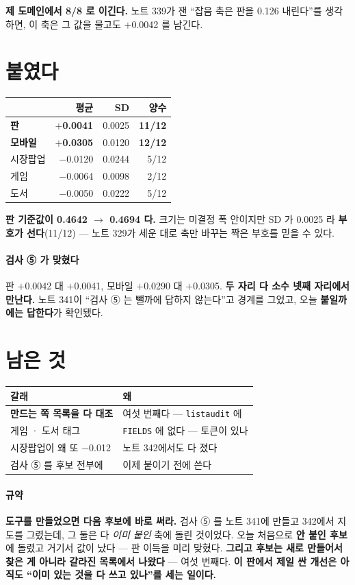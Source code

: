 \documentclass[10pt]{article}
\begin{document}
\textbf{제 도메인에서 8/8 로 이긴다.} 노트 339가 잰 ``잡음 축은 판을
0.126 내린다''를 생각하면, 이 축은 그 값을 물고도 $+$0.0042 를 남긴다.

\section{붙였다}

\begin{center}\footnotesize
\begin{tabular}{lrrr}
\hline
 & 평균 & SD & 양수 \\
\hline
\textbf{판} & \textbf{$+$0.0041} & 0.0025 & \textbf{11/12} \\
\textbf{모바일} & \textbf{$+$0.0305} & 0.0120 & \textbf{12/12} \\
시장팝업 & $-$0.0120 & 0.0244 & 5/12 \\
게임 & $-$0.0064 & 0.0098 & 2/12 \\
도서 & $-$0.0050 & 0.0222 & 5/12 \\
\hline
\end{tabular}
\end{center}

\textbf{판 기준값이 0.4642 $\to$ 0.4694 다.} 크기는 미결정 폭 안이지만
SD 가 0.0025 라 \textbf{부호가 선다}(11/12) --- 노트 329가 세운 대로
축만 바꾸는 짝은 부호를 믿을 수 있다.

\paragraph{검사 ⑤ 가 맞혔다} 판 $+$0.0042 대 $+$0.0041, 모바일
$+$0.0290 대 $+$0.0305. \textbf{두 자리 다 소수 넷째 자리에서 만난다.}
노트 341이 ``검사 ⑤ 는 뺄까에 답하지 않는다''고 경계를 그었고, 오늘
\textbf{붙일까에는 답한다}가 확인됐다.

\section{남은 것}
\begin{center}\footnotesize
\begin{tabular}{ll}
\hline
갈래 & 왜 \\
\hline
\textbf{만드는 쪽 목록을 다 대조} & 여섯 번째다 --- \texttt{listaudit} 에 \\
게임 · 도서 태그 & \texttt{FIELDS} 에 없다 --- 토큰이 있나 \\
시장팝업이 왜 또 $-$0.012 & 노트 342에서도 다 졌다 \\
검사 ⑤ 를 후보 전부에 & 이제 붙이기 전에 쓴다 \\
\hline
\end{tabular}
\end{center}

\paragraph{규약} \textbf{도구를 만들었으면 다음 후보에 바로 써라.} 검사 ⑤
를 노트 341에 만들고 342에서 지도를 그렸는데, 그 둘은 다 \emph{이미 붙인}
축에 돌린 것이었다. 오늘 처음으로 \textbf{안 붙인 후보}에 돌렸고 거기서
값이 났다 --- 판 이득을 미리 맞혔다. \textbf{그리고 후보는 새로 만들어서
찾은 게 아니라 갈라진 목록에서 나왔다} --- 여섯 번째다. \textbf{이 판에서
제일 싼 개선은 아직도 ``이미 있는 것을 다 쓰고 있나''를 세는 일이다.}
\end{document}
